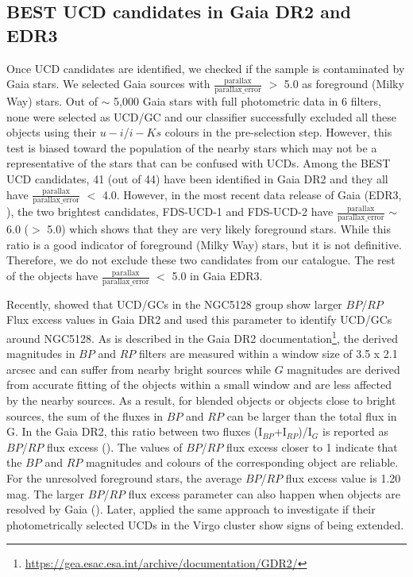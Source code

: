 \documentclass[fleqn,usenatbib]{mnras}
\begin{document}
\subsection{BEST UCD candidates in Gaia DR2 and EDR3}

Once UCD candidates are identified, we checked if the sample is contaminated by Gaia stars. We selected Gaia sources with $\frac{\text{parallax}}{\text{parallax$\_$error}}$ $>$ 5.0 as foreground (Milky Way) stars. Out of $\sim$ 5,000 Gaia stars with full photometric data in 6 filters, none were selected as UCD/GC and our classifier successfully excluded all these objects using their $u-i$/$i-Ks$ colours in the pre-selection step. However, this test is biased toward the population of the nearby stars which may not be a representative of the stars that can be confused with UCDs. Among the BEST UCD candidates, 41 (out of 44) have been identified in Gaia DR2 and they all have $\frac{\text{parallax}}{\text{parallax$\_$error}}$ $<$ 4.0. However, in the most recent data release of Gaia (EDR3, \citealp{gaia3}), the two brightest candidates, FDS-UCD-1 and FDS-UCD-2 have $\frac{\text{parallax}}{\text{parallax$\_$error}}$ $\sim$ 6.0 ($>$ 5.0) which shows that they are very likely foreground stars. While this ratio is a good indicator of foreground (Milky Way) stars, but it is not definitive. Therefore, we do not exclude these two candidates from our catalogue. The rest of the objects have $\frac{\text{parallax}}{\text{parallax$\_$error}}$ $<$ 5.0 in Gaia EDR3.

Recently, \citet{voggel2020} showed that UCD/GCs in the NGC5128 group show larger $BP$/$RP$ Flux excess values in Gaia DR2 and used this parameter to identify UCD/GCs around NGC5128. As is described in the Gaia DR2 documentation\footnote{\url{https://gea.esac.esa.int/archive/documentation/GDR2/}}, the derived magnitudes in $BP$ and $RP$ filters are measured within a window size of 3.5 x 2.1 arcsec and can suffer from nearby bright sources while $G$ magnitudes are derived from accurate fitting of the objects within a small window and are less affected by the nearby sources. As a result, for blended objects or objects close to bright sources, the sum of the fluxes in $BP$ and $RP$ can be larger than the total flux in G. In the Gaia DR2, this ratio between two fluxes (I$_{BP}$+I$_{RP}$)/I$_{G}$ is reported as $BP$/$RP$ flux excess (\citealp{evans2018}). The values of $BP$/$RP$ flux excess closer to 1 indicate that the $BP$ and $RP$ magnitudes and colours of the corresponding object are reliable. For the unresolved foreground stars, the average $BP$/$RP$ flux excess value is 1.20 mag. The larger $BP$/$RP$ flux excess parameter can also happen when objects are resolved by Gaia (\citealp{voggel2020}). Later, \citet{Liu-2020} applied the same approach to investigate if their photometrically selected UCDs in the Virgo cluster show signs of being extended.
\end{document}
